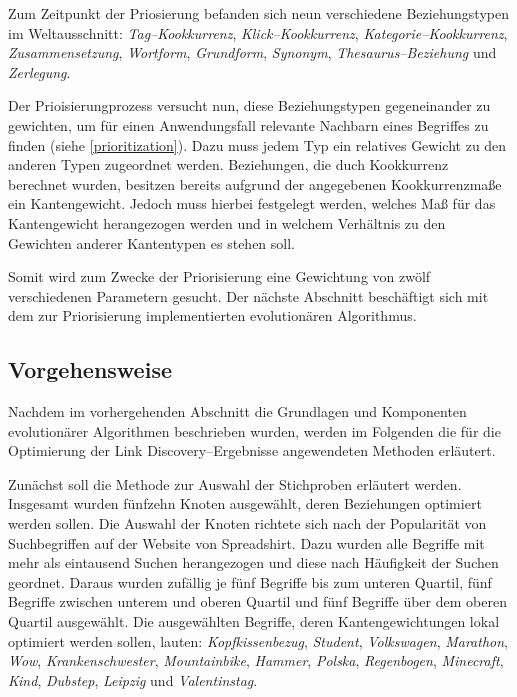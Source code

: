 Zum Zeitpunkt der Priosierung befanden sich neun verschiedene Beziehungstypen im Weltausschnitt: \emph{Tag--Kookkurrenz}, \emph{Klick--Kookkurrenz}, \emph{Kategorie--Kookkurrenz}, \emph{Zusammensetzung}, \emph{Wortform}, \emph{Grundform}, \emph{Synonym}, \emph{Thesaurus--Beziehung} und \emph{Zerlegung}.

Der Prioisierungprozess versucht nun, diese Beziehungstypen gegeneinander zu gewichten, um für einen Anwendungsfall relevante Nachbarn eines Begriffes zu finden (siehe \cref{prioritization}). Dazu muss jedem Typ ein relatives Gewicht zu den anderen Typen zugeordnet werden. Beziehungen, die duch Kookkurrenz berechnet wurden, besitzen bereits aufgrund der angegebenen Kookkurrenzmaße ein Kantengewicht. Jedoch muss hierbei festgelegt werden, welches Maß für das Kantengewicht herangezogen werden und in welchem Verhältnis zu den Gewichten anderer Kantentypen es stehen soll.

Somit wird zum Zwecke der Priorisierung eine Gewichtung von zwölf verschiedenen Parametern gesucht. Der nächste Abschnitt beschäftigt sich mit dem zur Priorisierung implementierten evolutionären Algorithmus.

\subsection{Vorgehensweise}
\label{evo_implementation}

Nachdem im vorhergehenden Abschnitt die Grundlagen und Komponenten evolutionärer Algorithmen beschrieben wurden, werden im Folgenden die für die Optimierung der Link Discovery--Ergebnisse angewendeten Methoden erläutert.

Zunächst soll die Methode zur Auswahl der Stichproben erläutert werden. Insgesamt wurden fünfzehn Knoten ausgewählt, deren Beziehungen optimiert werden sollen. Die Auswahl der Knoten richtete sich nach der Popularität von Suchbegriffen auf der Website von Spreadshirt. Dazu wurden alle Begriffe mit mehr als eintausend Suchen herangezogen und diese nach Häufigkeit der Suchen geordnet. Daraus wurden zufällig je fünf Begriffe bis zum unteren Quartil, fünf Begriffe zwischen unterem und oberen Quartil und fünf Begriffe über dem oberen Quartil ausgewählt. Die ausgewählten Begriffe, deren Kantengewichtungen lokal optimiert werden sollen, lauten: \emph{Kopfkissenbezug}, \emph{Student}, \emph{Volkswagen}, \emph{Marathon}, \emph{Wow}, \emph{Krankenschwester}, \emph{Mountainbike}, \emph{Hammer}, \emph{Polska}, \emph{Regenbogen}, \emph{Minecraft}, \emph{Kind}, \emph{Dubstep}, \emph{Leipzig} und \emph{Valentinstag}.

